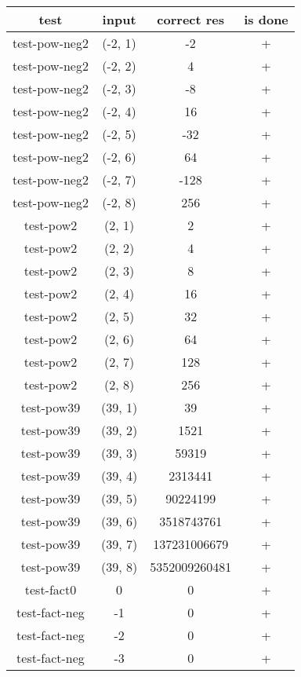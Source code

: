 \begin{tabular}{ |c|c|c|c| } 
  \hline
  test & input & correct res & is done \\
  \hline
  \hline
  test-pow-neg2& (-2, 1) & -2 & + \\ 
  \hline
  test-pow-neg2& (-2, 2) & 4 & + \\ 
  \hline
  test-pow-neg2& (-2, 3) & -8 & + \\ 
  \hline
  test-pow-neg2& (-2, 4) & 16 & + \\ 
  \hline
  test-pow-neg2& (-2, 5) & -32 & + \\ 
  \hline
  test-pow-neg2& (-2, 6) & 64 & + \\ 
  \hline
  test-pow-neg2& (-2, 7) & -128 & + \\ 
  \hline
  test-pow-neg2& (-2, 8) & 256 & + \\ 
  \hline
  test-pow2 & (2, 1) & 2 & + \\ 
  \hline
  test-pow2 & (2, 2) & 4 & + \\ 
  \hline
  test-pow2 & (2, 3) & 8 & + \\ 
  \hline
  test-pow2 & (2, 4) & 16 & + \\ 
  \hline
  test-pow2 & (2, 5) & 32 & + \\ 
  \hline
  test-pow2 & (2, 6) & 64 & + \\ 
  \hline
  test-pow2 & (2, 7) & 128 & + \\ 
  \hline
  test-pow2 & (2, 8) & 256 & + \\ 
  \hline
  test-pow39 & (39, 1) & 39 & + & \\ 
  \hline
  test-pow39 & (39, 2) & 1521 & + & \\ 
  \hline
  test-pow39 & (39, 3) & 59319 & + & \\ 
  \hline
  test-pow39 & (39, 4) & 2313441 & + & \\ 
  \hline
  test-pow39 & (39, 5) & 90224199 & + & \\ 
  \hline
  test-pow39 & (39, 6) & 3518743761 & + & \\ 
  \hline
  test-pow39 & (39, 7) & 137231006679 & + & \\ 
  \hline
  test-pow39 & (39, 8) & 5352009260481 & + & \\ 
  \hline
  test-fact0 & 0 & 0 & + \\ 
  \hline
  test-fact-neg & -1 & 0 & + \\ 
  \hline
  test-fact-neg & -2 & 0 & + \\ 
  \hline
  test-fact-neg & -3 & 0 & + \\ 
  \hline

\end{tabular}
